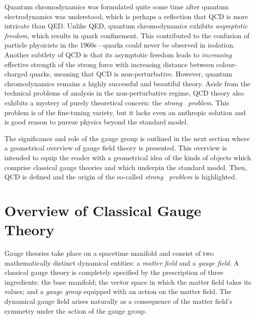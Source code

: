 Quantum chromodynamics was formulated quite some time after quantum electrodynamics was understood, which is perhaps a reflection that QCD is more intricate than QED.
Unlike QED, quantum chromodynamics exhibits \emph{asymptotic freedom}, which results in quark confinement.
This contributed to the confusion of particle physicists in the 1960s---quarks could never be observed in isolation.
Another subtlety of QCD is that its asymptotic freedom leads to \emph{increasing} effective strength of the strong force with increasing distance between colour-charged quarks, meaning that QCD is non-perturbative.
However, quantum chromodynamics remains a highly successful and beautiful theory.
Aside from the technical problems of analysis in the non-perturbative regime, QCD theory also exhibits a mystery of purely theoretical concern: the \emph{strong \CP\ problem}.
This problem is of the fine-tuning variety, but it lacks even an anthropic solution and is good reason to pursue physics beyond the standard model.


The significance and role of the gauge group is outlined in the next section where a geometrical overview of gauge field theory is presented.
This overview is intended to equip the reader with a geometrical idea of the kinds of objects which comprise classical gauge theories and which underpin the standard model.
Then, QCD is defined and the origin of the so-called \emph{strong \CP\ problem} is highlighted.



\section{Overview of Classical Gauge Theory}
\label{sec:overview-of-gauge-theory}

Gauge theories take place on a spacetime manifold and consist of two mathematically distinct dynamical entities: a \emph{matter field} and a \emph{gauge field}.
A classical gauge theory is completely specified by the prescription of three ingredients: the base manifold; the vector space in which the matter field takes its values; and a \emph{gauge group} equipped with an action on the matter field.
The dynamical gauge field arises naturally as a consequence of the matter field's symmetry under the action of the gauge group.

